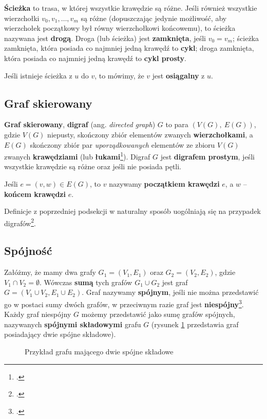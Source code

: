 \textbf{Ścieżka} to trasa, w której wszystkie krawędzie są różne. Jeśli również wszystkie wierzchołki $v_0,v_1,\ldots,v_m$ są różne (dopuszczając jedynie możliwość, aby wierzchołek początkowy był równy wierzchołkowi końcowemu), to ścieżka nazywana jest \textbf{drogą}. Droga (lub ścieżka) jest \textbf{zamknięta}, jeśli $v_0 = v_m$; ścieżka zamknięta, która posiada co najmniej jedną krawędź to \textbf{cykl}; droga zamknięta, która posiada co najmniej jedną krawędź to \textbf{cykl prosty}.

Jeśli istnieje ścieżka z $u$ do $v$, to mówimy, że $v$ jest \textbf{osiągalny} z $u$.

\subsection*{Graf skierowany}

\textbf{Graf skierowany}, \textbf{digraf} (ang. \textit{directed graph}) $G$ to para $(V(G),\ E(G))$, gdzie $V(G)$ niepusty, skończony zbiór elementów zwanych \textbf{wierzchołkami}, a $E(G)$ skończony zbiór par \emph{uporządkowanych} elementów ze zbioru $V(G)$ zwanych \textbf{krawędziami} (lub \textbf{łukami}\footcite[135]{wilson}). Digraf $G$ jest \textbf{digrafem prostym}, jeśli wszystkie krawędzie są różne oraz jeśli nie posiada pętli. 

Jeśli $e = (v,w) \in E(G)$, to $v$ nazywamy \textbf{początkiem krawędzi} $e$, a $w$ -- \textbf{końcem krawędzi} $e$.

Definicje z poprzedniej podsekcji w naturalny sposób uogólniają się na przypadek digrafów\footcite[136]{wilson}. 

\subsection*{Spójność}

Załóżmy, że mamy dwa grafy $G_1 = (V_1,E_1)$ oraz $G_2 = (V_2,E_2)$, gdzie $V_1 \cap V_2 = \emptyset$. Wówczas \textbf{sumą} tych grafów $G_1 \cup G_2$ jest graf $G=(V_1\cup V_2, E_1\cup E_2)$. Graf nazywamy \textbf{spójnym}, jeśli nie można przedstawić go w postaci sumy dwóch grafów, w przeciwnym razie graf jest \textbf{niespójny}\footcite[22]{wilson}. Każdy graf niespójny $G$ możemy przedstawić jako sumę grafów spójnych, nazywanych \textbf{spójnymi składowymi} grafu $G$ (rysunek \ref{fig:connected-copoments-example} przedstawia graf posiadający dwie spójne składowe). 

\begin{figure}[h]
\centering
{}
\caption{Przykład grafu mającego dwie spójne składowe} \label{fig:connected-copoments-example}
\end{figure}


